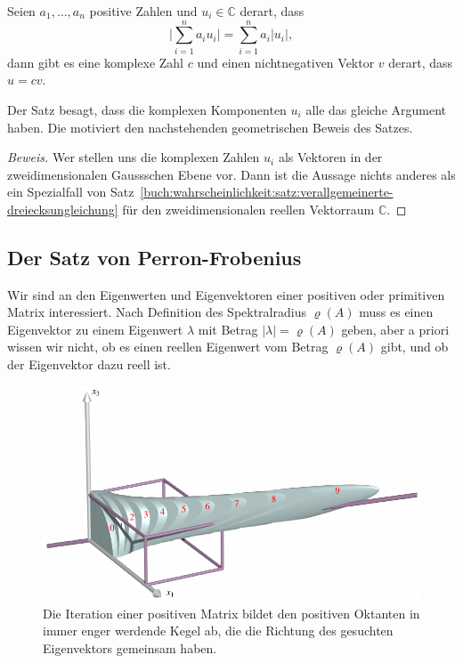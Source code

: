 \begin{satz}
\label{buch:wahrscheinlichkeit:satz:verallgdreieckC}
Seien $a_1,\dots,a_n$ positive Zahlen und $u_i\in\mathbb C$ derart,
dass 
\[
\biggl|
\sum_{i=1}^n a_i u_i
\biggr|
=
\sum_{i=1}^n a_i |u_i|,
\]
dann gibt es eine komplexe Zahl $c$ und einen nichtnegativen Vektor $v$
derart, dass $u=cv$.
\end{satz}

Der Satz besagt, dass die komplexen Komponenten $u_i$ alle das gleiche
Argument haben.
Die motiviert den nachstehenden geometrischen Beweis des Satzes.

\begin{proof}[Beweis]
Wer stellen uns die komplexen Zahlen $u_i$ als Vektoren in der
zweidimensionalen Gaussschen Ebene vor.
Dann ist die Aussage nichts anderes als ein Spezialfall von
Satz~\ref{buch:wahrscheinlichkeit:satz:verallgemeinerte-dreiecksungleichung}
für den zweidimensionalen reellen Vektorraum $\mathbb{C}$.
\end{proof}


%
%
\subsection{Der Satz von Perron-Frobenius
\label{buch:subsection:der-satz-von-perron-frobenius}}
Wir sind an den Eigenwerten und Eigenvektoren einer positiven
oder primitiven Matrix interessiert.
Nach Definition des Spektralradius $\varrho(A)$ muss es einen Eigenvektor 
zu einem Eigenwert $\lambda$ mit Betrag $|\lambda|=\varrho(A)$ geben,
aber a priori wissen wir nicht, ob es einen reellen Eigenwert vom
Betrag $\varrho(A)$ gibt, und ob der Eigenvektor dazu reell ist.

\begin{figure}
\centering
\includegraphics{chapters/80-wahrscheinlichkeit/images/positiv.pdf}
\caption{Die Iteration einer positiven Matrix bildet den positiven Oktanten
in immer enger werdende Kegel ab, die die Richtung des gesuchten Eigenvektors
gemeinsam haben.
\label{buch:wahrscheinlichkeit:figure:positiv}}
\end{figure}

